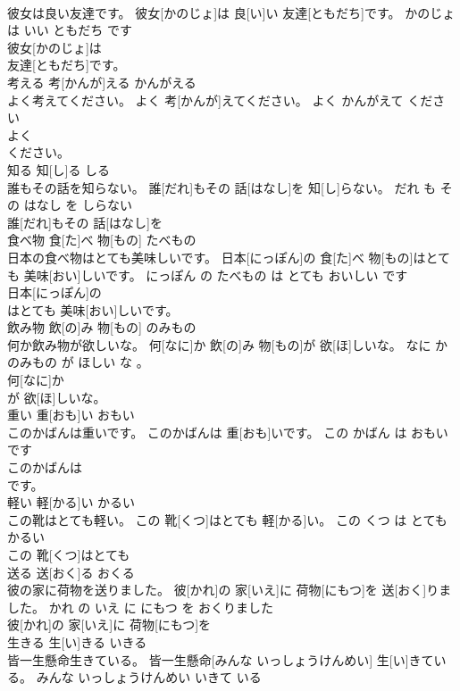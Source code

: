 \documentclass[8pt]{extreport}
\begin{document}
\begin{CJK}{UTF8}{min}
\\	彼女は良い友達です。	彼女[かのじょ]は 良[い]い 友達[ともだち]です。	かのじょ は いい ともだち です	
\\	彼女[かのじょ]は
\\	友達[ともだち]です。			
\\	考える	考[かんが]える	かんがえる	
\\	よく考えてください。	よく 考[かんが]えてください。	よく かんがえて ください	
\\	よく
\\	ください。			
\\	知る	知[し]る	しる	
\\	誰もその話を知らない。	誰[だれ]もその 話[はなし]を 知[し]らない。	だれ も その はなし を しらない	
\\	誰[だれ]もその 話[はなし]を
\\	食べ物	食[た]べ 物[もの]	たべもの	
\\	日本の食べ物はとても美味しいです。	日本[にっぽん]の 食[た]べ 物[もの]はとても 美味[おい]しいです。	にっぽん の たべもの は とても おいしい です	
\\	日本[にっぽん]の
\\	はとても 美味[おい]しいです。			
\\	飲み物	飲[の]み 物[もの]	のみもの	
\\	何か飲み物が欲しいな。	何[なに]か 飲[の]み 物[もの]が 欲[ほ]しいな。	なに か のみもの が ほしい な 。	
\\	何[なに]か
\\	が 欲[ほ]しいな。			
\\	重い	重[おも]い	おもい	
\\	このかばんは重いです。	このかばんは 重[おも]いです。	この かばん は おもい です	
\\	このかばんは
\\	です。			
\\	軽い	軽[かる]い	かるい	
\\	この靴はとても軽い。	この 靴[くつ]はとても 軽[かる]い。	この くつ は とても かるい	
\\	この 靴[くつ]はとても
\\	送る	送[おく]る	おくる	
\\	彼の家に荷物を送りました。	彼[かれ]の 家[いえ]に 荷物[にもつ]を 送[おく]りました。	かれ の いえ に にもつ を おくりました	
\\	彼[かれ]の 家[いえ]に 荷物[にもつ]を
\\	生きる	生[い]きる	いきる	
\\	皆一生懸命生きている。	皆一生懸命[みんな いっしょうけんめい] 生[い]きている。	みんな いっしょうけんめい いきて いる	

\end{CJK}
\end{document}
